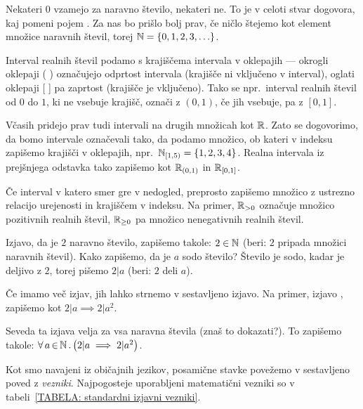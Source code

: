 		Nekateri $0$ vzamejo za naravno število, nekateri ne. To je v celoti stvar dogovora, kaj pomeni pojem . Za nas bo prišlo bolj prav, če ničlo štejemo kot element množice naravnih števil, torej $\NN = \set{0, 1, 2, 3, \ldots}$.
		
		Interval realnih števil podamo s krajiščema intervala v oklepajih --- okrogli oklepaji ( ) označujejo odprtost intervala (krajišče ni vključeno v interval), oglati oklepaji [ ] pa zaprtost (krajišče je vključeno). Tako se npr.~interval realnih števil od $0$ do $1$, ki ne vsebuje krajišč, označi z $(0, 1)$, če jih vsebuje, pa z $[0, 1]$.
		
		Včasih pridejo prav tudi intervali na drugih množicah kot $\mathbb{R}$. Zato se dogovorimo, da bomo intervale označevali tako, da podamo množico, ob kateri v indeksu zapišemo krajišči v oklepajih, npr.~$\intco[\NN]{1}{5} = \set{1, 2, 3, 4}$. Realna intervala iz prejšnjega odstavka tako zapišemo kot ${\mathbb{R}}_{(0, 1)}$ in ${\mathbb{R}}_{[0, 1]}$.
		
		Če interval v katero smer gre v nedogled, preprosto zapišemo množico z ustrezno relacijo urejenosti in krajiščem v indeksu. Na primer, $\mathbb{R}_{> 0}$ označuje množico pozitivnih realnih števil, $\mathbb{R}_{\geq 0}$ pa množico nenegativnih realnih števil.
		
		
		Izjavo, da je $2$ naravno število, zapišemo takole: $2 \in \mathbb{N}$ (beri: $2$ pripada množici naravnih števil). Kako zapišemo, da je $a$ sodo število? Število je sodo, kadar je deljivo z $2$, torej pišemo $2 | a$ (beri: $2$ deli $a$).
		
		Če imamo več izjav, jih lahko strnemo v sestavljeno izjavo. Na primer, izjavo , zapišemo kot $2 | a \implies 2 | a^2$.
		
		Seveda ta izjava velja za vsa naravna števila (znaš to dokazati?). To zapišemo takole: $\all{a}{\NN}{2 | a \implies 2 | a^2}$.
		
		Kot smo navajeni iz običajnih jezikov, posamične stavke povežemo v sestavljeno poved z \emph{vezniki}. Najpogosteje uporabljeni matematični vezniki so v tabeli~\ref{TABELA: standardni izjavni vezniki}.
		
